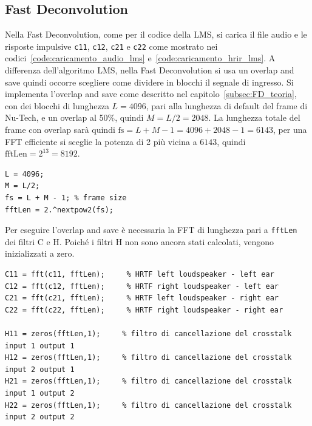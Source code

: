 \documentclass[12pt,a4paper,titlepage]{article}
\begin{document}
\subsection{Fast Deconvolution}
\label{subsec:codice_matlab_fd}
Nella Fast Deconvolution, come per il codice della LMS, si carica il file audio e le risposte impulsive \texttt{c11}, \texttt{c12}, \texttt{c21} e \texttt{c22} come mostrato nei codici~\ref{code:caricamento_audio_lms} e~\ref{code:caricamento_hrir_lms}. A differenza dell'algoritmo LMS, nella Fast Deconvolution si usa un overlap and save quindi occorre scegliere come dividere in blocchi il segnale di ingresso. Si implementa l'overlap and save come descritto nel capitolo~\ref{subsec:FD_teoria}, con dei blocchi di lunghezza $L = 4096$, pari alla lunghezza di default del frame di Nu-Tech, e un overlap al 50\%, quindi $M = L/2 = 2048$. La lunghezza totale del frame con overlap sarà quindi $\text{fs} = L + M - 1 = 4096+2048-1 = 6143$, per una FFT efficiente si sceglie la potenza di 2 più vicina a $6143$, quindi $\text{fftLen} = 2^{13} = 8192$.

\begin{lstlisting}[label=code:parametri_ols, caption=Parametri overlap and save, captionpos=b]
L = 4096;
M = L/2;
fs = L + M - 1; % frame size
fftLen = 2.^nextpow2(fs);
\end{lstlisting}

Per eseguire l'overlap and save è necessaria la FFT di lunghezza pari a \texttt{fftLen} dei filtri C e H. Poiché i filtri H non sono ancora stati calcolati, vengono inizializzati a zero.

\begin{lstlisting}[label=code:fft_hrir, caption=FFT delle risposte impulsive del canale e inizializzazione dei filtri di cancellazione del crosstalk, captionpos=b]
C11 = fft(c11, fftLen);     % HRTF left loudspeaker - left ear
C12 = fft(c12, fftLen);     % HRTF right loudspeaker - left ear
C21 = fft(c21, fftLen);     % HRTF left loudspeaker - right ear
C22 = fft(c22, fftLen);     % HRTF right loudspeaker - right ear

H11 = zeros(fftLen,1);     % filtro di cancellazione del crosstalk input 1 output 1
H12 = zeros(fftLen,1);     % filtro di cancellazione del crosstalk input 2 output 1
H21 = zeros(fftLen,1);     % filtro di cancellazione del crosstalk input 1 output 2
H22 = zeros(fftLen,1);     % filtro di cancellazione del crosstalk input 2 output 2
\end{lstlisting}
\end{document}
